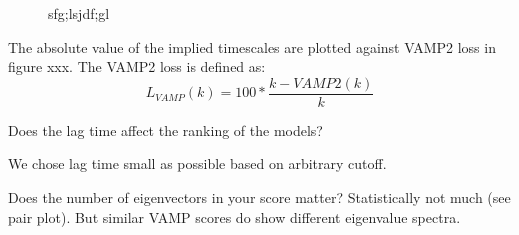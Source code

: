 \documentclass[journal=jacsat,manuscript=article]{achemso}
\begin{document}
\begin{figure}[ht]
    

\caption{sfg;lsjdf;gl }

\end{figure}






The absolute value of the implied timescales are plotted against VAMP2 loss in figure xxx. The VAMP2 loss is defined as: 
\begin{equation}
    L_{VAMP}(k)= 100*\frac{k-VAMP2(k)}{k}
\end{equation}

Does the lag time affect the ranking of the models? 

We chose lag time small as possible based on arbitrary cutoff.  

Does the number of eigenvectors in your score matter? Statistically not much (see pair plot). But similar VAMP scores do show different eigenvalue spectra. 



\end{document}
